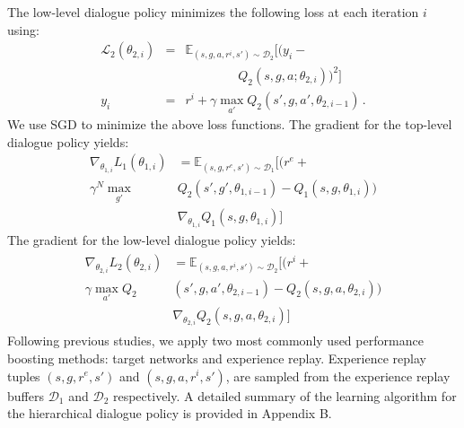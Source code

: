 \documentclass[11pt,letterpaper]{article}
\begin{document}
The low-level dialogue policy minimizes the following loss at each iteration $i$ using:
\begin{eqnarray*}
\mathcal{L}_2(\theta_{2,i}) &=& \mathbb{E}_{(s,g,a,r^i,s')\sim  \mathcal{D}_2}[(y_i - \\
&& \ \ \ \ \ \ \ \ \ \ \ \ \ \ \ \  \ \ \  Q_2(s,g,  a;\theta_{2,i}))^2] \\
 y_i &=& r^i +\gamma \max_{a'}Q_2(s',g, a',\theta_{2,i-1})\,.
\end{eqnarray*}
We use SGD to minimize the above loss functions. The gradient for the top-level dialogue policy yields:
\begin{equation}
\label{eq:g1}
\begin{split}
\nabla_{\theta_{1,i}}L_1(\theta_{1,i}) &= \mathbb{E}_{(s,g,r^e,s')\sim \mathcal{D}_1} [(r^e + \\\gamma^N \max_{g'} & Q_2(s',g',\theta_{1,i-1}) - Q_1(s,g,\theta_{1,i})) \\ & \nabla_{\theta_{1,i}}Q_1(s,g,\theta_{1,i})]
\end{split}
\end{equation}
The gradient for the low-level dialogue policy yields:
\begin{equation}
\label{eq:g2}
\begin{split}
\begin{split}
\nabla_{\theta_{2,i}}L_2(\theta_{2,i}) &= \mathbb{E}_{(s,g,a,r^i,s')\sim \mathcal{D}_2} [(r^i + \\
\gamma \max_{a'}  Q_2&(s',g,a',\theta_{2,i-1})  - Q_2(s,g,a,\theta_{2,i})) \\
  & \nabla_{\theta_{2,i}}Q_2(s,g,a,\theta_{2,i})]
\end{split}
\end{split}
\end{equation}
Following previous studies, we apply two most commonly used performance boosting methods: target networks and experience replay. Experience replay tuples $(s,g,r^e,s')$ and $(s,g,a,r^i,s')$, are sampled from the experience replay buffers $\mathcal{D}_1$ and $\mathcal{D}_2$ respectively. A detailed summary of the learning algorithm for the hierarchical dialogue policy is provided in Appendix B.%
\end{document}
